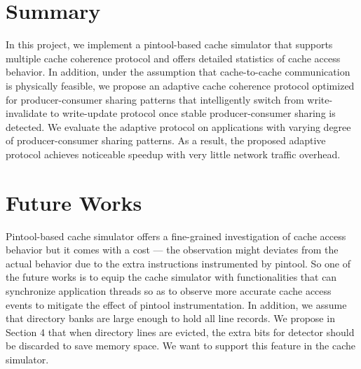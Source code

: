 \documentclass[11pt,conference]{IEEEtran}
\begin{document}
\newpage
\null\newpage

\section{Summary}
In this project, we implement a pintool-based cache simulator that supports multiple cache coherence protocol and offers detailed statistics of cache access behavior. In addition, under the assumption that cache-to-cache communication is physically feasible, we propose an adaptive cache coherence protocol optimized for producer-consumer sharing patterns that intelligently switch from write-invalidate to write-update protocol once stable producer-consumer sharing is detected. We evaluate the adaptive protocol on applications with varying degree of producer-consumer sharing patterns. As a result, the proposed adaptive protocol achieves noticeable speedup with very little network traffic overhead.


\section{Future Works}

Pintool-based \cite{pintool} cache simulator offers a fine-grained investigation of cache access behavior but it comes with a cost --- the observation might deviates from the actual behavior due to the extra instructions instrumented by pintool. So one of the future works is to equip the cache simulator with functionalities that can synchronize application threads so as to observe more accurate cache access events to mitigate the effect of pintool instrumentation. In addition, we assume that directory banks are large enough to hold all line records. We propose in Section 4 that when directory lines are evicted, the extra bits for detector should be discarded to save memory space. We want to support this feature in the cache simulator.
\end{document}

